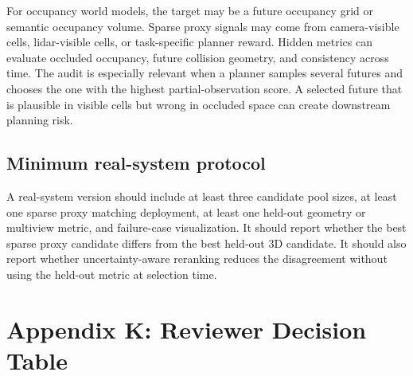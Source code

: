 \documentclass{article}
\begin{document}
For occupancy world models, the target may be a future occupancy grid or
semantic occupancy volume. Sparse proxy signals may come from camera-visible
cells, lidar-visible cells, or task-specific planner reward. Hidden metrics can
evaluate occluded occupancy, future collision geometry, and consistency across
time. The audit is especially relevant when a planner samples several futures
and chooses the one with the highest partial-observation score. A selected
future that is plausible in visible cells but wrong in occluded space can create
downstream planning risk.

\subsection{Minimum real-system protocol}

A real-system version should include at least three candidate pool sizes, at
least one sparse proxy matching deployment, at least one held-out geometry or
multiview metric, and failure-case visualization. It should report whether the
best sparse proxy candidate differs from the best held-out 3D candidate. It
should also report whether uncertainty-aware reranking reduces the disagreement
without using the held-out metric at selection time.

\section{Appendix K: Reviewer Decision Table}
\end{document}
